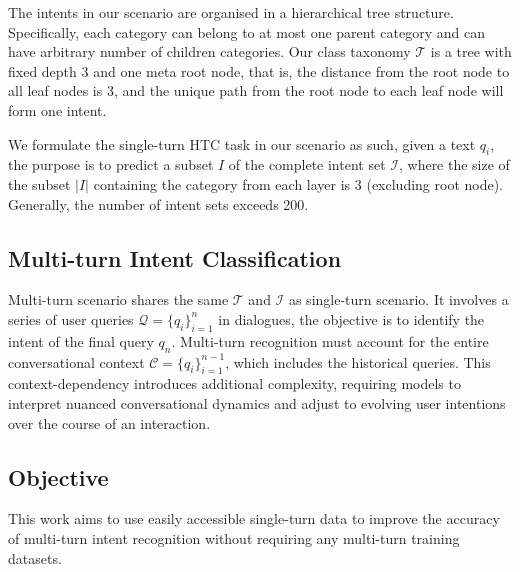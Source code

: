 The intents in our scenario are organised in a hierarchical tree structure. Specifically, each category can belong to at most one parent category and can have arbitrary number of children categories. Our class taxonomy $\mathcal{T}$ is a tree with fixed depth 3 and one meta root node, that is, the distance from the root node to all leaf nodes is 3, and the unique path from the root node to each leaf node will form one intent. 

We formulate the single-turn HTC task in our scenario as such, given a text $q_i$, the purpose is to predict a subset $I$ of the complete intent set $\mathcal{I}$, where the size of the subset $|I|$ containing the category from each layer is 3 (excluding root node). Generally, the number of intent sets exceeds 200.  


\subsection{Multi-turn Intent Classification} Multi-turn scenario shares the same $\mathcal{T}$ and $\mathcal{I}$ as single-turn scenario. It involves a series of user queries $\mathcal{Q} = \{q_i\}_{i=1}^n$ in dialogues, the objective is to identify the intent of the final query $q_n$. Multi-turn recognition must account for the entire conversational context $\mathcal{C} = \{q_i\}_{i=1}^{n-1}$, which includes the historical queries. This context-dependency introduces additional complexity, requiring models to interpret nuanced conversational dynamics and adjust to evolving user intentions over the course of an interaction.

\subsection{Objective} This work aims to use easily accessible single-turn data to improve the accuracy of multi-turn intent recognition without requiring any multi-turn training datasets. 

